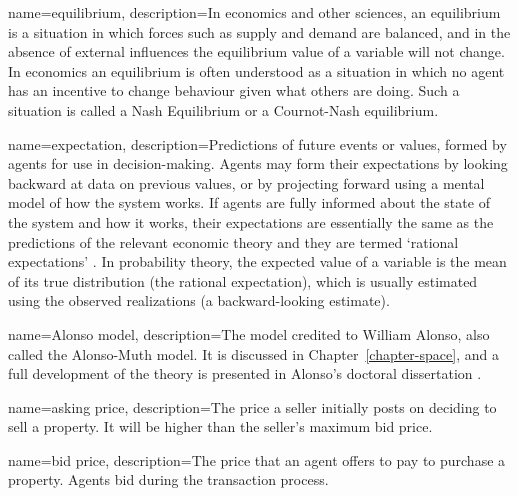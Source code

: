 {
name=equilibrium,
description={In economics and other sciences, an equilibrium is a situation in which forces such as supply and demand are balanced, and in the absence of external influences the equilibrium value of a variable will not change. In economics an equilibrium is often understood %
as a situation in which no agent has an incentive to change behaviour given what others are doing. Such a situation is called a Nash Equilibrium or a Cournot-Nash equilibrium.}
}


{
name=expectation,
description={Predictions of future events or values, formed by agents for use in decision-making. Agents may form their expectations by looking backward at data on previous values, or by projecting forward using a mental model of how the system works. If agents are fully informed about the state of the system and how it works, their expectations are essentially the same as the predictions of the relevant economic theory and they are termed `rational expectations' \cite{muthRationalExpectationsTheory1961}. In probability theory, the expected value of a variable is the mean of its true distribution (the rational expectation), which is usually estimated using the observed realizations (a backward-looking estimate).}
}

{
name=Alonso model,
description={The model credited to William Alonso, also called the Alonso-Muth model. It is discussed in Chapter~\ref{chapter-space}, and a full development of the theory is presented in Alonso's doctoral dissertation \cite{alonsoTheoryUrbanLand1960}.} %
}

{
name=asking price,
description={The price a seller initially posts on deciding to sell a property. It will be higher than the seller's maximum bid price.}
}

{
name=bid price,
description={The %
price that an agent offers to pay to purchase a property. Agents bid during the transaction process.} %
}

